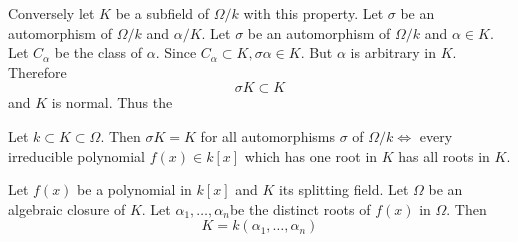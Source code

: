  Conversely let $K$ be a subfield of $ \Omega / k $ with this
 property. Let $ \sigma $ be an automorphism of $ \Omega /k $ and $
 \alpha / K $. Let $\sigma$ be an automorphism of $\Omega /k$ and
 $\alpha \in K$. Let $C_\alpha$ be the class of $\alpha$. Since
 $C_\alpha \subset K, \sigma \alpha \in K $. But $\alpha$ is
 arbitrary in  $ K$. Therefore 
 $$
 \sigma K \subset K
 $$
and $ K $ is normal. Thus the 

\begin{thm}\label{c2:thm2}%
Let $ k \subset K \subset  \Omega $. Then $ \sigma K = K $ for all
  automorphisms $ \sigma $ of $ \Omega / k \Longleftrightarrow  $
  every irreducible polynomial $ f (x) \in k [ x ] $ which has one
  root in $K$ has all roots in $K$. 
\end{thm}

Let $f (x) $ be a polynomial in $ k [ x ] $ and $K$ its splitting
field. Let $\Omega$ be an algebraic  closure of $K$. Let $ \alpha_1
, \ldots , \alpha_n $\pageoriginale be the distinct roots of $f (x) $
in $ \Omega $. Then   
$$
K= k ( \alpha_1 , \ldots , \alpha_n ) 
$$

